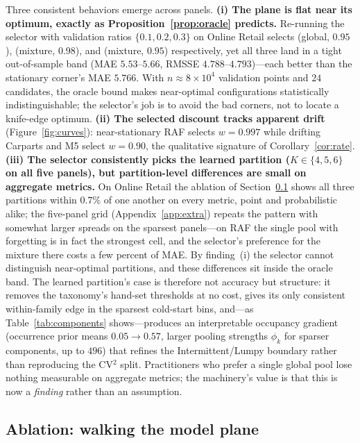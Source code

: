 \documentclass[twocolumn,10pt]{article}
\begin{document}
Three consistent behaviors emerge across panels. \textbf{(i) The plane is flat near its
optimum, exactly as Proposition~\ref{prop:oracle} predicts.} Re-running
the selector with validation ratios $\{0.1,0.2,0.3\}$ on Online Retail
selects (global, $0.95$), (mixture, $0.98$), and (mixture, $0.95$)
respectively, yet all three land in a tight out-of-sample band (MAE
$5.53$--$5.66$, RMSSE $4.788$--$4.793$)---each better than the
stationary corner's MAE $5.766$. With $n\approx8\times10^4$ validation
points and $24$ candidates, the oracle bound makes near-optimal
configurations statistically indistinguishable; the selector's job is to
avoid the bad corners, not to locate a knife-edge optimum.
\textbf{(ii) The selected discount tracks apparent drift}
(Figure~\ref{fig:curves}): near-stationary RAF selects $w{=}0.997$ while
drifting Carparts and M5 select $w{=}0.90$, the qualitative signature of
Corollary~\ref{cor:rate}. \textbf{(iii) The selector consistently picks
the learned partition ($K\in\{4,5,6\}$ on all five panels), but
partition-level differences are small on aggregate metrics.} On Online Retail the
ablation of Section~\ref{sec:ablation} shows all three partitions within
$0.7\%$ of one another on every metric, point and probabilistic alike;
the five-panel grid (Appendix~\ref{app:extra}) repeats the pattern with
somewhat larger spreads on the sparsest panels---on RAF the single pool
with forgetting is in fact the strongest cell, and the selector's
preference for the mixture there costs a few percent of MAE. By
finding~(i) the selector cannot distinguish near-optimal partitions, and
these differences sit inside the oracle band. The
learned partition's case is therefore not accuracy but structure: it
removes the taxonomy's hand-set thresholds at no cost, gives its only
consistent within-family edge in the sparsest cold-start bins, and---as
Table~\ref{tab:components} shows---produces an interpretable occupancy
gradient (occurrence prior means $0.05\to0.57$, larger pooling strengths
$\phi_k$ for sparser components, up to $496$) that refines the
Intermittent/Lumpy boundary rather than reproducing the CV$^2$ split.
Practitioners who prefer a single global pool lose nothing measurable on
aggregate metrics; the machinery's value is that this is now a
\emph{finding} rather than an assumption.

\subsection{Ablation: walking the model plane}\label{sec:ablation}
\end{document}
